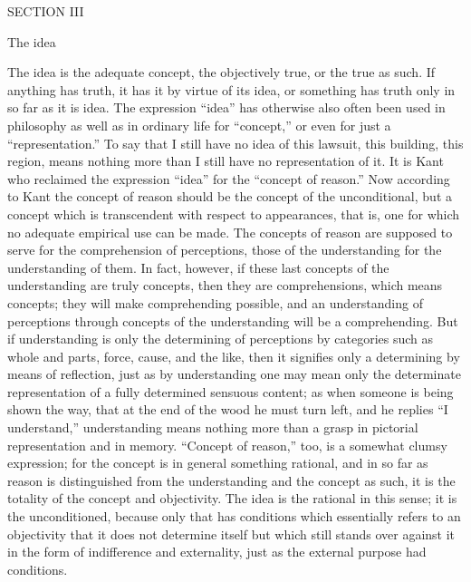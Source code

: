 SECTION III

The idea

The idea is the adequate concept,
the objectively true,
or the true as such.
If anything has truth,
it has it by virtue of its idea,
or something has truth only
in so far as it is idea.
The expression “idea” has otherwise also often been used
in philosophy as well as in ordinary life for “concept,”
or even for just a “representation.”
To say that I still have no idea of
this lawsuit, this building, this region,
means nothing more than I still have no representation of it.
It is Kant who reclaimed the expression “idea”
for the “concept of reason.”
Now according to Kant the concept of reason
should be the concept of the unconditional,
but a concept which is transcendent
with respect to appearances,
that is, one for which no adequate empirical use can be made.
The concepts of reason are supposed to serve
for the comprehension of perceptions,
those of the understanding for the understanding of them.
In fact, however, if these last
concepts of the understanding are truly concepts,
then they are comprehensions, which means concepts;
they will make comprehending possible,
and an understanding of perceptions
through concepts of the understanding
will be a comprehending.
But if understanding is only
the determining of perceptions by categories
such as whole and parts, force, cause, and the like,
then it signifies only a determining by means of reflection,
just as by understanding one may mean only the determinate
representation of a fully determined sensuous content;
as when someone is being shown the way,
that at the end of the wood he must turn left,
and he replies “I understand,”
understanding means nothing more than a grasp
in pictorial representation and in memory.
“Concept of reason,” too, is a somewhat clumsy expression;
for the concept is in general something rational,
and in so far as reason is distinguished
from the understanding and the concept as such,
it is the totality of the concept and objectivity.
The idea is the rational in this sense;
it is the unconditioned,
because only that has conditions
which essentially refers to an objectivity
that it does not determine itself
but which still stands over against it
in the form of indifference and externality,
just as the external purpose had conditions.

